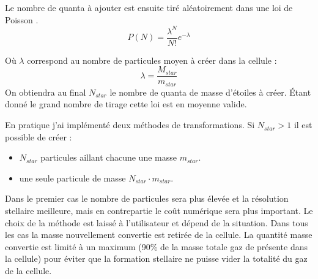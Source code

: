 Le nombre de quanta à ajouter est ensuite tiré aléatoirement dans une loi de Poisson \citep{rasera_history_2006}.
\begin{equation}
	P(N) = \frac{\lambda^N}{N!} e^{-\lambda}
\end{equation}

Où $\lambda$ correspond au nombre de particules moyen à créer dans la cellule :
\begin{equation}
\lambda = \frac{ M_{star}}{m_{star}}
\end{equation}
On obtiendra au final $N_{star}$ le nombre de quanta de masse d'étoiles à créer.
Étant donné le grand nombre de tirage cette loi est en moyenne valide.

En pratique j'ai implémenté deux méthodes de transformations.
Si  $N_{star}>1$ il est possible de créer : 
\begin{itemize}
\item  $N_{star}$ particules aillant chacune une masse  $m_{star}$.
\item une seule particule de masse  $N_{star} \cdot m_{star}$.
\end{itemize}

Dans le premier cas le nombre de particules sera plus élevée et la résolution stellaire meilleure, mais en contrepartie le coût numérique sera plus important.
Le choix de la méthode est laissé à l'utilisateur et dépend de la situation.
Dans tous les cas la masse nouvellement convertie est retirée de la cellule.
La quantité masse convertie est limité à un maximum (90\% de la masse totale gaz de présente dans la cellule) pour éviter que la formation stellaire ne puisse vider la totalité du gaz de la cellule.



